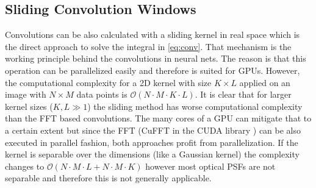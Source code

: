 \documentclass{juliacon}
\begin{document}
\subsection{Sliding Convolution Windows}
Convolutions can be also calculated with a sliding kernel in real space which is the direct approach to
solve the integral in \autoref{eq:conv}.
That mechanism is the working principle
behind the convolutions in neural nets. The reason is that this operation can be parallelized easily and therefore 
is suited for GPUs. However, the computational complexity for a 2D kernel with size $K \times L$ applied on an image with
$N \times M$ data points is $\mathcal O(N \cdot M \cdot K \cdot L)$. It is clear that for larger kernel sizes ($K,L \gg 1$) the sliding method 
has worse computational complexity than the FFT based convolutions. The many cores of a GPU can mitigate that to a certain extent
but since the FFT (CuFFT in the CUDA library \cite{CUDA}) can be also executed in parallel fashion, both approaches profit from parallelization.
If the kernel is separable over the dimensions (like a Gaussian kernel) the complexity changes to $\mathcal O(N \cdot M \cdot L +  N \cdot M \cdot K)$ however most optical PSFs are not separable and therefore this is not generally applicable. 
\end{document}
